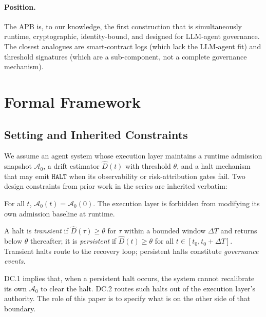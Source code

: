 \documentclass[11pt]{article}
\newcommand{\Azero}{\mathcal{A}_0}
\newcommand{\Dhat}{\widehat{D}}
\newcommand{\HALT}{\texttt{HALT}}
\begin{document}
\paragraph{Position.}
The APB is, to our knowledge, the first construction that is
simultaneously runtime, cryptographic, identity-bound, and designed
for LLM-agent governance. The closest analogues are smart-contract
logs (which lack the LLM-agent fit) and threshold signatures (which
are a sub-component, not a complete governance mechanism).

\section{Formal Framework}
\label{sec:framework}

\subsection{Setting and Inherited Constraints}
\label{sec:setting}

We assume an agent system whose execution layer maintains a runtime
admission snapshot $\Azero$, a drift estimator $\Dhat(t)$ with
threshold $\theta$, and a halt mechanism that may emit
$\HALT$ when its observability or risk-attribution gates fail.
Two design constraints from prior work in the series
\citep{fernandez2026applied} are inherited verbatim:
\begin{description}[leftmargin=2em, topsep=2pt]
  \item[DC.1 (Separation of Recalibration Authority).]
        For all $t$, $\Azero(t) = \Azero(0)$. The execution layer
        is forbidden from modifying its own admission baseline at
        runtime.
  \item[DC.2 (Drift Event Classification).]
        A halt is \emph{transient} if $\Dhat(\tau) \geq \theta$ for
        $\tau$ within a bounded window $\Delta T$ and returns below
        $\theta$ thereafter; it is \emph{persistent} if
        $\Dhat(t) \geq \theta$ for all $t \in [t_0, t_0 + \Delta T]$.
        Transient halts route to the recovery loop; persistent halts
        constitute \emph{governance events}.
\end{description}

DC.1 implies that, when a persistent halt occurs, the system cannot
recalibrate its own $\Azero$ to clear the halt. DC.2 routes such halts
out of the execution layer's authority. The role of this paper is to
specify what is on the other side of that boundary.
\end{document}
